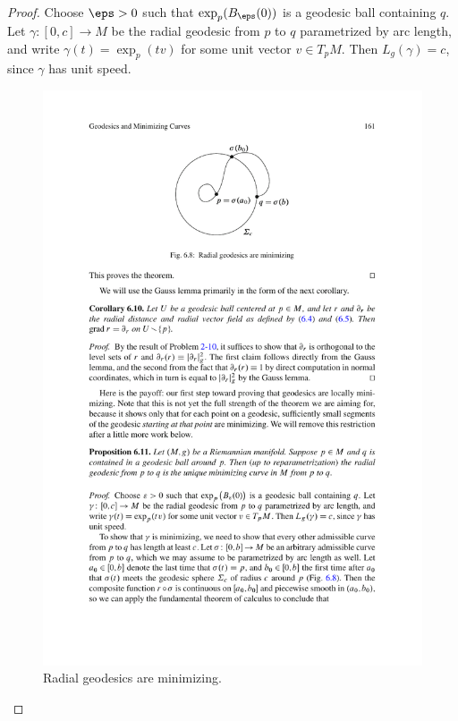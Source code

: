 \begin{proof}
Choose $\eps>0$ such that $\exp_p(B_{\eps}(0))$ is a geodesic ball containing $q$. Let $\gamma:[0,c]\to M$ be the radial geodesic from $p$ to $q$ parametrized by arc length, and write $\gamma(t)=\exp_p(tv)$ for some unit vector $v\in T_pM$. Then $L_g(\gamma)=c$, since $\gamma$ has unit speed.
\begin{figure}[htbp]
\centering
\includegraphics{pictures/radial-geodesic}
\caption{Radial geodesics are minimizing.}
\end{figure}


\end{proof}
